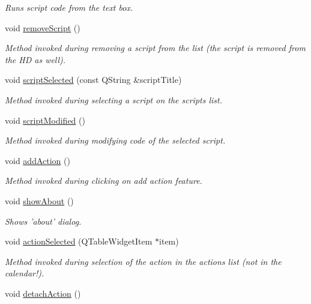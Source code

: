 \begin{DoxyCompactItemize}
\begin{DoxyCompactList}\small\item\em Runs script code from the text box. \end{DoxyCompactList}\item 
void \hyperlink{classmain_win_a3ad8d9509ece99d6e322db2d56a9fa51}{remove\-Script} ()
\begin{DoxyCompactList}\small\item\em Method invoked during removing a script from the list (the script is removed from the H\-D as well). \end{DoxyCompactList}\item 
void \hyperlink{classmain_win_af5eb5f12f6e8bf37e9a293e28d82632c}{script\-Selected} (const Q\-String \&script\-Title)
\begin{DoxyCompactList}\small\item\em Method invoked during selecting a script on the scripts list. \end{DoxyCompactList}\item 
void \hyperlink{classmain_win_affa3129c6021871bfc6ab5acccb0a9c5}{script\-Modified} ()
\begin{DoxyCompactList}\small\item\em Method invoked during modifying code of the selected script. \end{DoxyCompactList}\item 
void \hyperlink{classmain_win_abfe17be5efdd261fa5d73c37c66b57e8}{add\-Action} ()
\begin{DoxyCompactList}\small\item\em Method invoked during clicking on add action feature. \end{DoxyCompactList}\item 
void \hyperlink{classmain_win_a971bee9dff02167121566f9a4444af4e}{show\-About} ()
\begin{DoxyCompactList}\small\item\em Shows 'about' dialog. \end{DoxyCompactList}\item 
void \hyperlink{classmain_win_aef242a8707d462171f02a6156d5a949e}{action\-Selected} (Q\-Table\-Widget\-Item $\ast$item)
\begin{DoxyCompactList}\small\item\em Method invoked during selection of the action in the actions list (not in the calendar!). \end{DoxyCompactList}\item 
void \hyperlink{classmain_win_a1833795590c91fa73da6a224f31ce5d2}{detach\-Action} ()

\end{DoxyCompactItemize}
